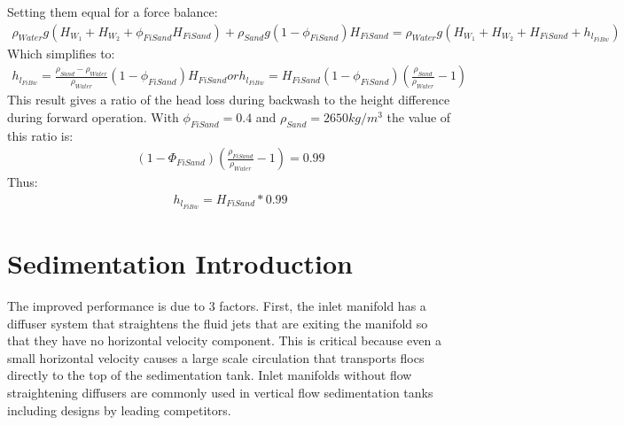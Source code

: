 \documentclass[letterpaper,10pt,english]{sphinxmanual}
\begin{document}
Setting them equal for a force balance:
\begin{equation}\label{equation:Filtration/Filtration_Derivations:Filtration/Filtration_Derivations:2}
\begin{split}\rho_{Water} g \left( H_{W_1} + H_{W_2} + \phi_{FiSand} H_{FiSand} \right) + \rho_{Sand} g \left( 1 - \phi_{FiSand} \right) H_{FiSand} = \rho_{Water} g \left( H_{W_1} + H_{W_2} + H_{FiSand} + h_{l_{FiBw}} \right)\end{split}
\end{equation}
Which simplifies to:
\begin{equation}\label{equation:Filtration/Filtration_Derivations:Filtration/Filtration_Derivations:3}
\begin{split}h_{l_{FiBw}} = \frac{\rho_{Sand} - \rho_{Water}}{\rho_{Water}} \left( 1 - \phi_{FiSand} \right) H_{FiSand}
or
h_{l_{FiBw}} = H_{FiSand} \left( 1 - \phi_{FiSand} \right)  \left( \frac{\rho_{Sand}}{\rho_{Water}} - 1 \right)\end{split}
\end{equation}
This result gives a ratio of the head loss during backwash to the height difference during forward operation. With \(\phi_{FiSand} = 0.4\) and \(\rho_{Sand} = 2650 kg/m^3\) the value of this ratio is:
\begin{equation}\label{equation:Filtration/Filtration_Derivations:Filtration/Filtration_Derivations:4}
\begin{split}\left( 1- \Phi_{FiSand} \right) \left( \frac{\rho_{FiSand}}{\rho_{Water}} - 1 \right) = 0.99\end{split}
\end{equation}
Thus:
\begin{equation}\label{equation:Filtration/Filtration_Derivations:Filtration/Filtration_Derivations:5}
\begin{split}h_{l_{FiBw}} = H_{FiSand} * 0.99\end{split}
\end{equation}

\chapter{Sedimentation Introduction}
\label{\detokenize{Sedimentation/Sed_Intro:sedimentation-introduction}}\label{\detokenize{Sedimentation/Sed_Intro:sedimentation-intro}}\label{\detokenize{Sedimentation/Sed_Intro::doc}}
The improved performance is due to 3 factors. First, the inlet manifold has a diffuser system that straightens the fluid jets that are exiting the manifold so that they have no horizontal velocity component. This is critical because even a small horizontal velocity causes a large scale circulation that transports flocs directly to the top of the sedimentation tank. Inlet manifolds without flow straightening diffusers are commonly used in vertical flow sedimentation tanks including designs by leading competitors.
\end{document}
